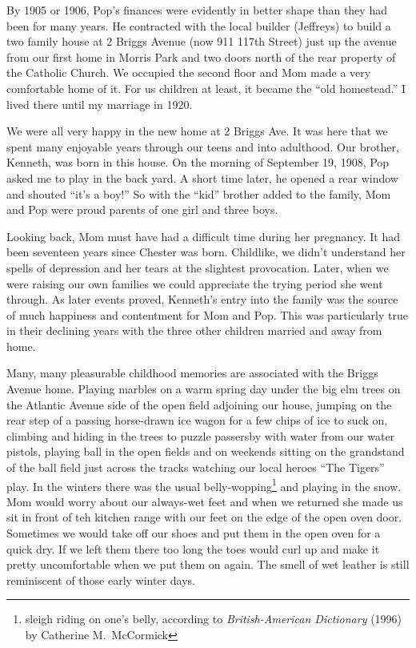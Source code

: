 \documentclass[12pt]{book}              %
\begin{document}
By 1905 or 1906, Pop's finances were evidently in better shape than they had been for many years. He contracted with the local builder (Jeffreys) to build a two family house at 2 Briggs Avenue (now 911 117th Street) just up the avenue from our first home in Morris Park and two doors north of the rear property of the Catholic Church. We occupied the second floor and Mom made a very comfortable home of it. For us children at least, it became the ``old homestead.'' I lived there until my marriage in 1920.

We were all very happy in the new home at 2 Briggs Ave. It was here that we spent many enjoyable years through our teens and into adulthood. Our brother, Kenneth, was born in this house. On the morning of September 19, 1908, Pop asked me to play in the back yard. A short time later, he opened a rear window and shouted ``it's a boy!'' So with the ``kid'' brother added to the family, Mom and Pop were proud parents of one girl and three boys. 

Looking back, Mom must have had a difficult time during her pregnancy. It had been seventeen years since Chester was born. Childlike, we didn't understand her spells of depression and her tears at the slightest provocation. Later, when we were raising our own families we could appreciate the trying period she went through. As later events proved, Kenneth's entry into the family was the source of much happiness and contentment for Mom and Pop. This was particularly true in their declining years with the three other children married and away from home.

Many, many pleasurable childhood memories are associated with the Briggs Avenue home. Playing marbles on a warm spring day under the big elm trees on the Atlantic Avenue side of the open field adjoining our house, jumping on the rear step of a passing horse-drawn ice wagon for a few chips of ice to suck on, climbing and hiding in the trees to puzzle passersby with water from our water pistols, playing ball in the open fields and on weekends sitting on the grandstand of the ball field just across the tracks watching our local heroes ``The Tigers'' play. In the winters there was the usual belly-wopping\footnote{sleigh riding on one's belly, according to {\it British-American Dictionary} (1996) by Catherine M.~McCormick} and playing in the snow. Mom would worry about our always-wet feet and when we returned she made us sit in front of teh kitchen range with our feet on the edge of the open oven door. Sometimes we would take off our shoes and put them in the open oven for a quick dry. If we left them there too long the toes would curl up and make it pretty uncomfortable when we put them on again. The smell of wet leather is still reminiscent of those early winter days. 
\end{document}
